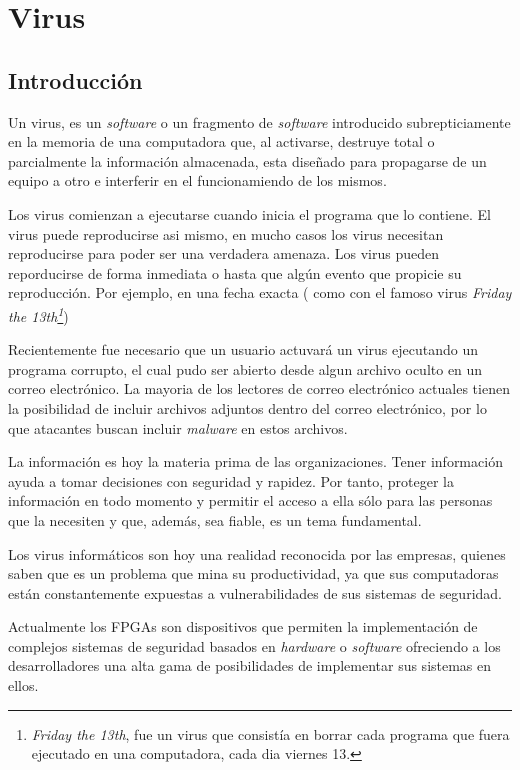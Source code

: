 \chapter{Virus}

\section{Introducción}

Un virus, es un \emph{software} o un fragmento de \emph{software} introducido
subrepticiamente en la memoria de una computadora que, al activarse, destruye
total o parcialmente la información almacenada, esta diseñado para propagarse de
un equipo a otro e interferir en el funcionamiendo de los mismos\cite{lehtinen}.

Los virus comienzan a ejecutarse cuando inicia el programa que lo contiene. El
virus puede reproducirse asi mismo, en mucho casos los virus necesitan
reproducirse para poder ser una verdadera amenaza. Los virus pueden
reporducirse de forma inmediata o hasta que algún evento que propicie su
reproducción. Por ejemplo, en una fecha exacta ( como con el famoso virus
\emph{Friday the 13th\footnote{\emph{Friday the 13th}, fue un virus
que consistía en borrar cada programa que fuera ejecutado en una
computadora, cada dia viernes 13.}})

Recientemente  fue necesario que un usuario actuvará un virus ejecutando un
programa corrupto, el cual pudo ser abierto desde algun archivo oculto en un
correo electrónico. La mayoria de los lectores de correo electrónico actuales
tienen la posibilidad de incluir archivos adjuntos dentro del correo
electrónico, por lo que atacantes buscan incluir \emph{malware} en estos
archivos.

La información es hoy la materia prima de las organizaciones. Tener información
ayuda a tomar decisiones con seguridad y rapidez. Por tanto, proteger la
información en todo momento y permitir el acceso a ella sólo para las personas
que la necesiten y que, además, sea fiable, es un tema fundamental.

Los virus inform\'aticos son hoy una realidad reconocida por las empresas,
quienes saben que es un problema que mina su productividad, ya que sus
computadoras est\'an constantemente expuestas a vulnerabilidades de sus sistemas
de seguridad.

Actualmente los FPGAs son dispositivos que permiten la implementaci\'on de
complejos sistemas de seguridad basados en \emph{hardware} o \emph{software}
ofreciendo a los desarrolladores una alta gama de posibilidades de implementar
sus sistemas en ellos.

